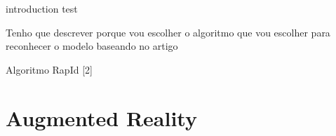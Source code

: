 introduction test



Tenho que descrever porque vou escolher o algoritmo que vou escolher para reconhecer o modelo baseando no artigo \cite{Lepetit05monocularmodel-based}

Algoritmo RapId [2]


\section{Augmented Reality}
